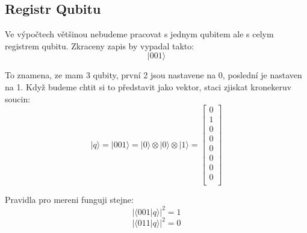 \documentclass[12pt]{article}
\begin{document}
\subsection{Registr Qubitu}
Ve výpočtech většinou nebudeme pracovat s jednym qubitem ale s celym registrem qubitu. Zkraceny zapis by vypadal takto:
$$|001\rangle$$
\par To znamena, ze mam 3 qubity, první 2 jsou nastavene na 0, poslední je nastaven na 1.
Když budeme chtit si to představit jako vektor, staci zjiskat kronekeruv soucin:
$$|q\rangle = |001\rangle = |0\rangle \otimes |0\rangle \otimes |1\rangle = \begin{bmatrix}
        0 \\
        1 \\
        0 \\
        0 \\
        0 \\
        0 \\
        0 \\
        0 \\
    \end{bmatrix}$$
\par Pravidla pro mereni funguji stejne:
$$|\langle001|q\rangle|^2 = 1$$
$$|\langle 011|q\rangle|^2 = 0$$
\end{document}
